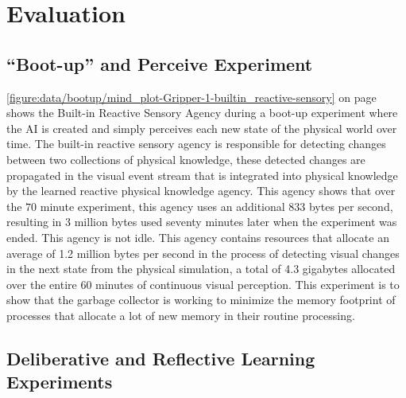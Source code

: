 \chapter{Evaluation}
\label{chapter:evaulation}

\section{``Boot-up'' and Perceive Experiment}

\autoref{figure:data/bootup/mind_plot-Gripper-1-builtin_reactive-sensory}
on page
\pageref{figure:data/bootup/mind_plot-Gripper-1-builtin_reactive-sensory}
shows the Built-in Reactive Sensory Agency during a boot-up experiment
where the AI is created and simply perceives each new state of the
physical world over time.  The built-in reactive sensory agency is
responsible for detecting changes between two collections of physical
knowledge, these detected changes are propagated in the visual event
stream that is integrated into physical knowledge by the learned
reactive physical knowledge agency.  This agency shows that over the
$70$ minute experiment, this agency uses an additional 833 bytes per
second, resulting in 3 million bytes used seventy minutes later when
the experiment was ended.  This agency is not idle.  This agency
contains resources that allocate an average of 1.2 million bytes per
second in the process of detecting visual changes in the next state
from the physical simulation, a total of 4.3 gigabytes allocated over
the entire 60 minutes of continuous visual perception.  This
experiment is to show that the garbage collector is working to
minimize the memory footprint of processes that allocate a lot of new
memory in their routine processing.

\section{Deliberative and Reflective Learning Experiments}


                                                             


